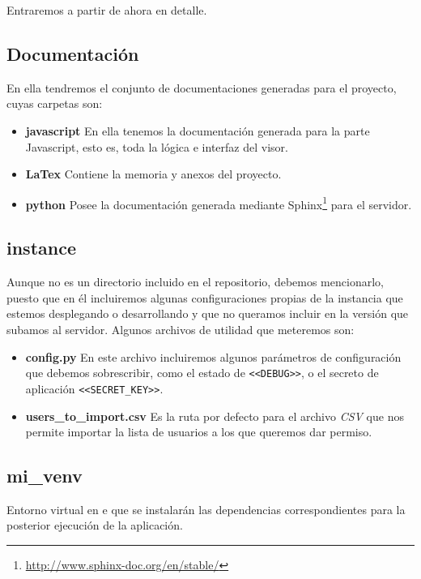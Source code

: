 \noindent Entraremos a partir de ahora en detalle.

\subsection{Documentación}
En ella tendremos el conjunto de documentaciones generadas para el proyecto, cuyas carpetas son:
\begin{itemize}
	\item \textbf{javascript} En ella tenemos la documentación generada para la parte Javascript, esto es, toda la lógica e interfaz del visor.
	\item \textbf{LaTex} Contiene la memoria y anexos del proyecto.
	\item \textbf{python} Posee la documentación generada mediante Sphinx\footnote{\url{http://www.sphinx-doc.org/en/stable/}} para el servidor.
\end{itemize}

\subsection{instance}
Aunque no es un directorio incluido en el repositorio, debemos mencionarlo, puesto que en él incluiremos algunas configuraciones propias de la instancia que estemos desplegando o desarrollando y que no queramos incluir en la versión que subamos al servidor. Algunos archivos de utilidad que meteremos son:
\begin{itemize}
	\item \textbf{config.py} En este archivo incluiremos algunos parámetros de configuración que debemos sobrescribir, como el estado de \texttt{<<DEBUG>>}, o el secreto de aplicación \texttt{<<SECRET\_KEY>>}.
	\item \textbf{users\_to\_import.csv} Es la ruta por defecto para el archivo \textit{CSV} que nos permite importar la lista de usuarios a los que queremos dar permiso.
\end{itemize}

\subsection{mi\_venv}
Entorno virtual en e que se instalarán las dependencias correspondientes para la posterior ejecución de la aplicación.

